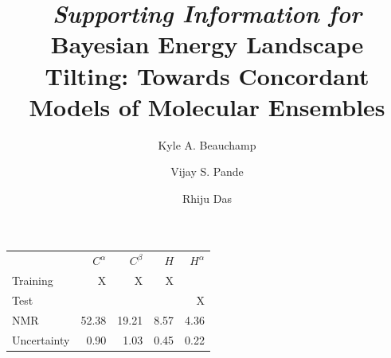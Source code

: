 \documentclass[12pt]{article}
\author{Kyle A. Beauchamp \and Vijay S. Pande \and Rhiju Das}
\title{{\it Supporting Information for } Bayesian Energy Landscape Tilting: Towards Concordant Models of Molecular Ensembles}
\begin{document}
\maketitle


\newpage

\begin{table}
 
\begin{tabular}{lrrrr}
\toprule
  &    $C^\alpha$ &    $C^\beta$ &    $H$ &   $H^\alpha$ \\
Training & X & X & X & \\                    
Test & &  & & X \\
NMR                         & 52.38  & 19.21  & 8.57  & 4.36  \\
Uncertainty                 &  0.90  &  1.03  & 0.45  & 0.22  \\


\end{tabular}
\end{table}
\end{document}
